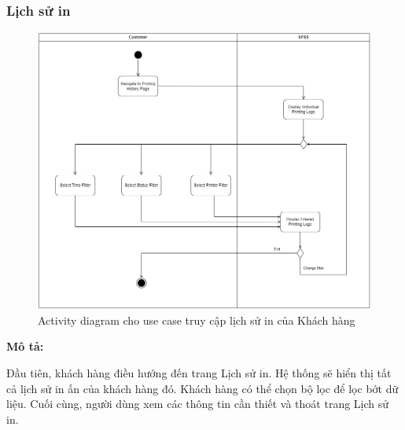 \subsubsection{Lịch sử in}
\begin{figure}[H]
    \begin{center}
        \includegraphics[width=1\textwidth]{Images/System Modelling/Logging(customer)_Activity.png}
        \caption{Activity diagram cho use case truy cập lịch sử in của Khách hàng}
        \label{fig:arch}
    \end{center}
\end{figure}
\textbf{Mô tả:}\par
Đầu tiên, khách hàng điều hướng đến trang Lịch sử in. Hệ thống sẽ hiển thị tất cả lịch sử in ấn của khách hàng đó. Khách hàng có thể chọn bộ lọc để lọc bớt dữ liệu. Cuối cùng, người dùng xem các thông tin cần thiết và thoát trang Lịch sử in.

